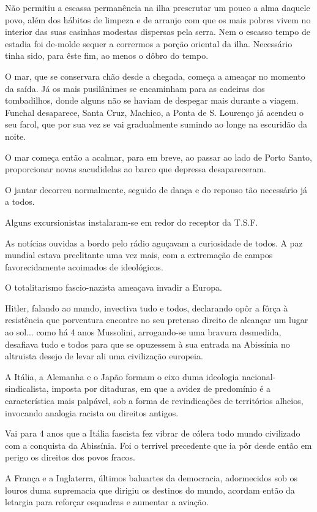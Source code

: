 \documentclass[9pt]{article}
\begin{document}
Não permitiu a escassa permanência na i\-lha prescrutar um pouco a alma
daquele povo, além dos hábitos de limpeza e de arranjo com que os mais pobres vivem no interior das suas casinhas modestas dispersas pela serra.
Nem o escasso tempo de estadia foi de-molde sequer a corrermos a por\-ção
oriental da i\-lha. Necessário tinha sido, para êste fim, ao menos o dôbro do
tempo.

O mar, que se conservara chão desde a chegada, começa a ameaçar no momento da saída. Já os mais pusilânimes se encaminham para as cadeiras dos
tombadi\-lhos, donde alguns não se haviam de despegar mais durante a viagem.
Funchal desaparece, Santa Cruz, Machico, a Ponta de S. Lourenço já acendeu
o seu farol, que por sua vez se vai gradualmente sumindo ao longe na escuridão da noite.

O mar começa então a acalmar, para em breve, ao passar ao lado de Porto Santo, proporcionar novas sacudidelas ao barco que depressa desapareceram.

O jantar decorreu normalmente, seguido de dan\-ça e do repouso tão necessário já a todos.

Alguns excursionistas instalaram-se em redor do receptor da T.S.F.

As notícias ouvidas a bordo pelo rádio aguçavam a curiosidade de todos.
A paz mundial estava preclitante uma vez mais, com a extrema\-ção de campos
favorecidamente acoimados de ideológicos.

O totalitarismo fascio-nazista ameaçava invadir a Europa.

Hitler, falando ao mundo, invectiva tudo e todos, declarando opôr a fôrça
à resistência que porventura encontre no seu pretenso direito de alcan\-çar
um lugar ao sol... como há 4 anos Mussolini, arrogando-se uma bravura desmedida, desafiava tudo e todos para que se opuzessem à sua entrada na Abissínia no altruista desejo de levar ali uma civiliza\-ção europeia.

A Itália, a Alemanha e o Japão formam o eixo duma ideologia na\-cio\-nal-sindicalista, imposta por ditaduras, em que a avidez de predomínio é a característica mais palpável, sob a forma de revindica\-ções de territórios a\-lheios,
invocando analogia racista ou direitos antigos.

Vai para 4 anos que a Itália fascista fez vibrar de cólera todo mundo civilizado com a conquista da Abissínia. Foi o terrível precedente que
ia pôr desde então em perigo os direitos dos povos fracos.

A Fran\-ça e a Inglaterra, últimos baluartes da democracia, adormecidos
sob os louros duma supremacia que dirigiu os destinos do mundo, acordam então da letargia para reforçar esquadras e aumentar a avia\-ção.
\end{document}
